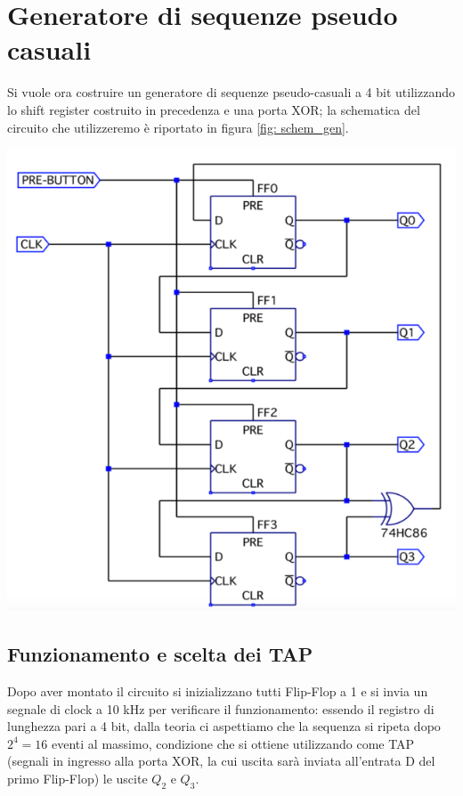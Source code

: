 \documentclass[10pt, a4paper, italian]{article}
\begin{document}
\section{Generatore di sequenze pseudo casuali}
\begin{minipage}{0.6\textwidth}
Si vuole ora costruire un generatore di sequenze pseudo-casuali a 4 bit utilizzando lo shift register costruito in precedenza e una porta XOR; la schematica del circuito che utilizzeremo è riportato in figura \cref{fig: schem_gen}.
\end{minipage}
\begin{minipage}{0.4\textwidth}
	\includegraphics[width=\textwidth]{schem_gen}
\end{minipage}
\subsection{Funzionamento e scelta dei TAP}
Dopo aver montato il circuito si inizializzano tutti Flip-Flop a 1 e si invia un segnale di clock a 10 kHz per verificare il funzionamento: 
essendo il registro di lunghezza pari a 4 bit, dalla teoria ci aspettiamo che la sequenza si ripeta dopo $2^4 = 16$ eventi al massimo, condizione che si ottiene utilizzando come TAP (segnali in ingresso alla porta XOR, la cui uscita sarà inviata all'entrata D del primo Flip-Flop) le uscite $Q_2$ e $Q_3$. 
\end{document}
